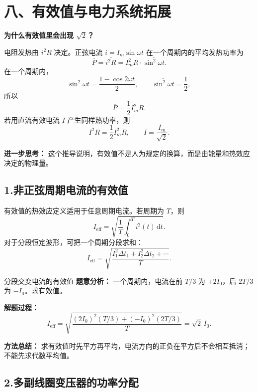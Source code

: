 \section*{八、有效值与电力系统拓展}
\begin{competitionbox}
\textbf{为什么有效值里会出现 $\sqrt2$？}

电阻发热由 $i^2R$ 决定。正弦电流 $i=I_m\sin\omega t$ 在一个周期内的平均发热功率为
\[
\overline P=\overline{i^2R}=I_m^2R\cdot\overline{\sin^2\omega t}.
\]
在一个周期内，
\[
\sin^2\omega t=\frac{1-\cos2\omega t}{2},
\qquad
\overline{\sin^2\omega t}=\frac12,
\]
所以
\[
\overline P=\frac12I_m^2R.
\]
若用直流有效电流 $I$ 产生同样热功率，则
\[
I^2R=\frac12I_m^2R,\qquad I=\frac{I_m}{\sqrt2}.
\]

\textbf{进一步思考：} 这个推导说明，有效值不是人为规定的换算，而是由能量和热效应决定的物理量。
\end{competitionbox}

\subsection*{1.\quad 非正弦周期电流的有效值}

有效值的热效应定义适用于任意周期电流。若周期为 $T$，则
\[
\boxed{I_{\mathrm{eff}}
=\sqrt{\frac1T\int_0^T i^2(t)\,\mathrm dt}}.
\]
对于分段恒定波形，可把一个周期分段求和：
\[
I_{\mathrm{eff}}
=\sqrt{\frac{I_1^2\Delta t_1+I_2^2\Delta t_2+\cdots}{T}}.
\]

\begin{center}


\label{fig:ac-nonsinusoidal-rms}
\end{center}

\begin{examplebox}{分段交变电流的有效值}
\textbf{题意分析：} 一个周期内，电流在前 $T/3$ 为 $+2I_0$，后 $2T/3$ 为 $-I_0$。求有效值。

\textbf{解题过程：}
\[
I_{\mathrm{eff}}
=\sqrt{\frac{(2I_0)^2(T/3)+(-I_0)^2(2T/3)}{T}}
=\sqrt2\,I_0.
\]

\textbf{方法总结：} 求有效值时先平方再平均，电流方向的正负在平方后不会相互抵消；不能先求代数平均值。
\end{examplebox}

\subsection*{2.\quad 多副线圈变压器的功率分配}

